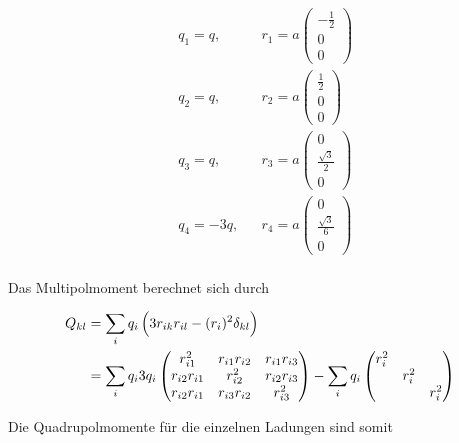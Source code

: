 \documentclass[a4paper,german,12pt,smallheadings]{scrartcl}
\begin{document}
\begin{align}
  &q_1 = q, &&r_1 = a\begin{pmatrix} -\frac{1}{2} \\ 0 \\ 0 \end{pmatrix} \\
  &q_2 = q, &&r_2 = a\begin{pmatrix} \frac{1}{2} \\ 0 \\ 0 \end{pmatrix} \\
  &q_3 = q, &&r_3 = a\begin{pmatrix} 0 \\ \frac{\sqrt{3}}{2} \\ 0 \end{pmatrix} \\
  &q_4 = -3q, &&r_4 = a\begin{pmatrix} 0 \\ \frac{\sqrt{3}}{6} \\ 0 \end{pmatrix} \\
\end{align}

Das Multipolmoment berechnet sich durch

\begin{align}
  Q_{kl} &= \sum_i q_i \del{3 r_{ik} r_{il} - (r_i)^2 \delta_{kl}} \\
       &= \sum_i q_i 3 q_i \begin{pmatrix}
        r_{i1}^2     & r_{i1} r_{i2}  & r_{i1} r_{i3} \\
        r_{i2} r_{i1} & r_{i2}^2      & r_{i2} r_{i3} \\
        r_{i2} r_{i1} & r_{i3} r_{i2} & r_{i3}^2 \\
      \end{pmatrix} - \sum_i q_i \begin{pmatrix}
        r_i^2 &       &       \\
              & r_i^2 &       \\
              &       & r_i^2
      \end{pmatrix}
\end{align}

Die Quadrupolmomente für die einzelnen Ladungen sind somit
\end{document}
